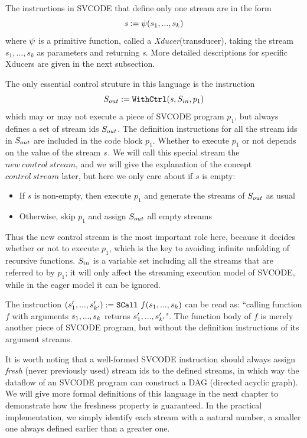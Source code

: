 The instructions in SVCODE that define only one stream are in the form
$$\sdef{\s}{\psi(s_1,...,s_k)} $$  
where $\lcall$ is a primitive function, called a \emph{Xducer}(transducer), taking the stream $s_1,...,s_k$ as parameters and returning \emph{s}. More detailed descriptions for specific Xducers are given in the next subsection.


The only essential control struture in this language is the \wc instruction 
$$\withctrl{\s}{p_1}{\Sin}{\Sout} $$
which may or may not execute a piece of SVCODE program $p_1$, but always defines a set of stream ids $\Sout$.
The definition instructions for all the stream ids in $\Sout$ are included in the code block $p_1$. 
Whether to execute $p_1$ or not depends on the value of the stream $\s$. We will call this special stream the $new \ control \ stream$, and we will give the explanation of the concept $control \ stream$ later, but here we only care about if $s$ is empty:
\begin{itemize}
	\item If $s$ is non-empty, then execute $p_1$ and generate the streams of $\Sout$ as usual
	\item Otherwise, skip $p_1$ and assign $\Sout$ all empty streams 
\end{itemize}
Thus the new control stream is the most important role here, because it decides whether or not to execute $p_1$, which is the key to avoiding infinite unfolding of recursive functions.  
$\Sin$ is a variable set including all the streams that are referred to by $p_1$;
it will only affect the streaming execution model of SVCODE, while in the eager model it can be ignored.

The instruction $\scall{f}{\replc{k}{s}}{(\replc{k'}{s'})}$ can be read as: ``calling function $f$ with arguments $\replc{k}{s}$ returns $\replc{k'}{s'}$". 
The function body of $f$ is merely another piece of SVCODE program, but without the definition instructions of its argument streams.


It is worth noting that a well-formed SVCODE instruction should always assign \emph{fresh} (never previously used) stream ids to the defined streams, in which way the dataflow of an SVCODE program can construct a DAG (directed acyclic graph). 
We will give more formal definitions of this language in the next chapter
to demonstrate how the freshness property is guaranteed. 
In the practical implementation, we simply identify each stream with a natural number, a smaller one always defined earlier than a greater one. 


